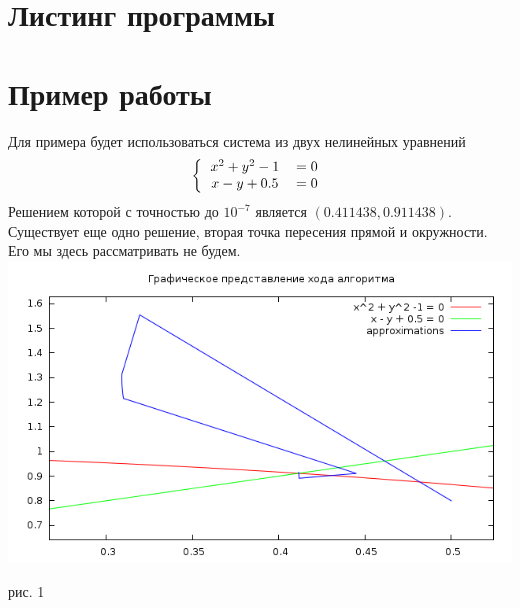 \documentclass[a4paper, 12pt]{article}
\begin{document}
\section*{Листинг программы}


\newpage
\section*{Пример работы}
Для примера будет использоваться система из двух нелинейных уравнений 
\begin{equation}
	\left\{
		\begin{tabular}{cc}
			$x^2 + y^2 - 1 $&$ = 0$\\
			$x-y+0.5$&$ = 0$
		\end{tabular}
		\right.
\end{equation}
Решением которой с точностью до $10^{-7}$ является $(0.411438, 0.911438)$. Существует еще одно решение, вторая точка пересения прямой и окружности. Его мы
здесь рассматривать не будем.\\
\includegraphics[width=\linewidth]{xs.png}
	\begin{center}
		рис. 1\\
	\end{center}
\end{document}
